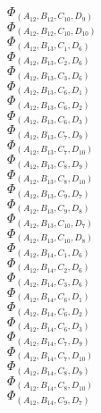 \documentclass[14pt]{article}
\begin{document}
    $\Phi_{({A}_{12}, {B}_{12}, {C}_{10}, {D}_{9})}$ \\ 
    $\Phi_{({A}_{12}, {B}_{12}, {C}_{10}, {D}_{10})}$ \\ 
    $\Phi_{({A}_{12}, {B}_{13}, {C}_{1}, {D}_{6})}$ \\ 
    $\Phi_{({A}_{12}, {B}_{13}, {C}_{2}, {D}_{6})}$ \\ 
    $\Phi_{({A}_{12}, {B}_{13}, {C}_{3}, {D}_{6})}$ \\ 
    $\Phi_{({A}_{12}, {B}_{13}, {C}_{6}, {D}_{1})}$ \\ 
    $\Phi_{({A}_{12}, {B}_{13}, {C}_{6}, {D}_{2})}$ \\ 
    $\Phi_{({A}_{12}, {B}_{13}, {C}_{6}, {D}_{3})}$ \\ 
    $\Phi_{({A}_{12}, {B}_{13}, {C}_{7}, {D}_{9})}$ \\ 
    $\Phi_{({A}_{12}, {B}_{13}, {C}_{7}, {D}_{10})}$ \\ 
    $\Phi_{({A}_{12}, {B}_{13}, {C}_{8}, {D}_{9})}$ \\ 
    $\Phi_{({A}_{12}, {B}_{13}, {C}_{8}, {D}_{10})}$ \\ 
    $\Phi_{({A}_{12}, {B}_{13}, {C}_{9}, {D}_{7})}$ \\ 
    $\Phi_{({A}_{12}, {B}_{13}, {C}_{9}, {D}_{8})}$ \\ 
    $\Phi_{({A}_{12}, {B}_{13}, {C}_{10}, {D}_{7})}$ \\ 
    $\Phi_{({A}_{12}, {B}_{13}, {C}_{10}, {D}_{8})}$ \\ 
    $\Phi_{({A}_{12}, {B}_{14}, {C}_{1}, {D}_{6})}$ \\ 
    $\Phi_{({A}_{12}, {B}_{14}, {C}_{2}, {D}_{6})}$ \\ 
    $\Phi_{({A}_{12}, {B}_{14}, {C}_{3}, {D}_{6})}$ \\ 
    $\Phi_{({A}_{12}, {B}_{14}, {C}_{6}, {D}_{1})}$ \\ 
    $\Phi_{({A}_{12}, {B}_{14}, {C}_{6}, {D}_{2})}$ \\ 
    $\Phi_{({A}_{12}, {B}_{14}, {C}_{6}, {D}_{3})}$ \\ 
    $\Phi_{({A}_{12}, {B}_{14}, {C}_{7}, {D}_{9})}$ \\ 
    $\Phi_{({A}_{12}, {B}_{14}, {C}_{7}, {D}_{10})}$ \\ 
    $\Phi_{({A}_{12}, {B}_{14}, {C}_{8}, {D}_{9})}$ \\ 
    $\Phi_{({A}_{12}, {B}_{14}, {C}_{8}, {D}_{10})}$ \\ 
    $\Phi_{({A}_{12}, {B}_{14}, {C}_{9}, {D}_{7})}$ \\ 
\end{document}
